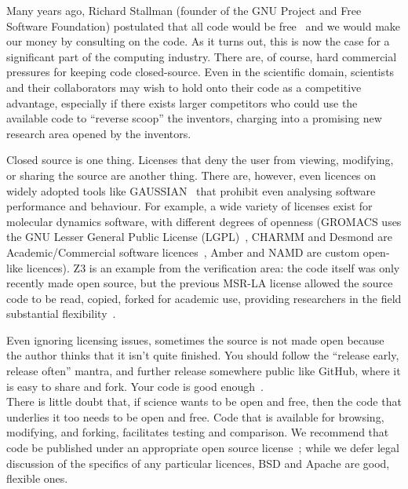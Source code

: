 \documentclass[a4paper,11pt]{article}
\begin{document}
Many years ago, Richard Stallman (founder of the GNU Project and Free
Software Foundation) postulated that all code would be
free~\cite{rms:2010} and we would make our money by consulting on the
code.  As it turns out, this is now the case for a significant
part of the computing industry. There are, of course, hard commercial
pressures for keeping code closed-source. Even in the scientific
domain, scientists and their collaborators may wish to hold onto their
code as a competitive advantage, especially if there exists larger
competitors who could use the available code to ``reverse scoop'' the
inventors, charging into a promising new research area opened by the
inventors.

Closed source is one thing. Licenses that deny the user from viewing,
modifying, or sharing the source are another thing. There are,
however, even licences on widely adopted tools like
GAUSSIAN~\cite{Giles2004} that prohibit even analysing software
performance and behaviour. For example, a wide variety of licenses
exist for molecular dynamics software, with different degrees of
openness (GROMACS uses the GNU Lesser General Public License
(LGPL)~\cite{Hess2008}, CHARMM and Desmond are Academic/Commercial
software licences~\cite{Brooks2009,Bowers2006}, Amber and NAMD are
custom open-like licences). Z3 is an example from the verification
area: the code itself was only recently made open source, but the previous MSR-LA license
allowed the source code to be read, copied, forked for academic use,
providing researchers in the field substantial flexibility~\cite{deMoura2012Z3open}.

Even ignoring licensing issues, sometimes the source is not made open
because the author thinks that it isn't quite finished. 
You should follow the ``release early, release often'' mantra, and
further release somewhere public like GitHub, where it is easy to
share and fork. Your code is good enough~\cite{barnes:2010}.
\\
 
 There is little
doubt that, if science wants to be open and free, then the code that
underlies it too needs to be open and free. Code that is available for
browsing, modifying, and forking, facilitates testing and comparison.
We recommend that code be published under an appropriate open source
license~\cite{osl}; while we defer legal discussion of the specifics
of any particular licences, BSD and Apache are good,
flexible ones.\\
\end{document}
